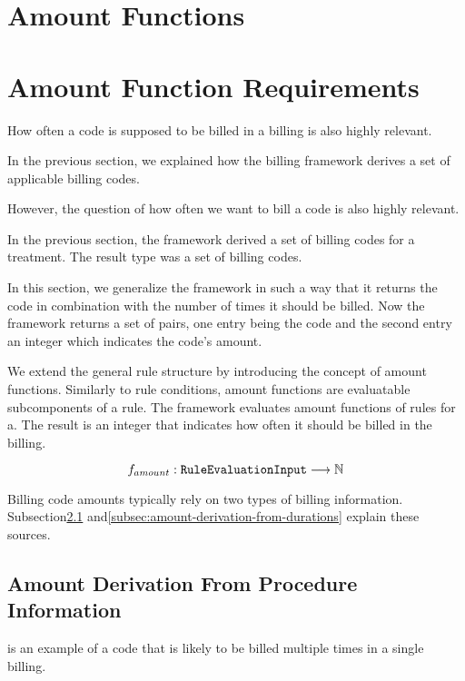 \section{Amount Functions}\label{sec:amount-functions}


\section{Amount Function Requirements}

How often a code is supposed to be billed in a billing is also highly relevant.

In the previous section, we explained how the billing framework derives a set of applicable billing codes.

However, the question of how often we want to bill a code is also highly relevant.

In the previous section, the framework derived a set of billing codes for a treatment.
The result type was a set of billing codes.

In this section, we generalize the framework in such a way that
it returns the code in combination with the number of times it should be billed.
Now the framework returns a set of pairs, one entry being the code and the second entry an integer which indicates the code's amount.

We extend the general rule structure by introducing the concept of amount functions.
Similarly to rule conditions, amount functions are evaluatable subcomponents of a rule.
The framework evaluates amount functions of rules for a.
The result is an integer that indicates how often it should be billed in the billing.

\begin{equation}
    \label{eq:amount-function-natural}
    f_{amount}: \texttt{RuleEvaluationInput} \longrightarrow \mathbb{N}
\end{equation}

Billing code amounts typically rely on two types of billing information.
Subsection\ref{subsec:amount-derivation-from-procedure-information} and\ref{subsec:amount-derivation-from-durations} explain these sources.

\subsection{Amount Derivation From Procedure Information}\label{subsec:amount-derivation-from-procedure-information}

\cite{hermanns2013bemessung} is an example of a code that is likely to be billed multiple times in a single billing.

